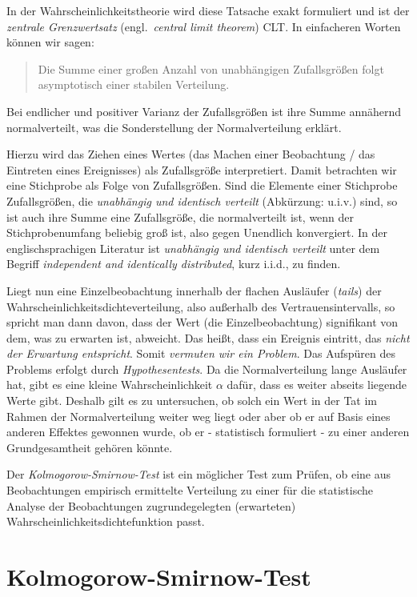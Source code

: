 In der Wahrscheinlichkeitstheorie wird diese Tatsache exakt formuliert und ist der
\textsl{zentrale Grenzwertsatz} (engl.\ \textsl{central limit theorem}) CLT.
In einfacheren Worten können wir sagen:
\begin{quote}
Die Summe einer großen Anzahl von unabhängigen Zufallsgrößen folgt
asymptotisch einer stabilen Verteilung.
\label{zentralesGrenzwerttheorem}
\end{quote}
Bei endlicher und positiver Varianz der Zufallsgrößen ist ihre Summe annähernd
normalverteilt, was die Sonderstellung der Normalverteilung erklärt.

Hierzu wird das Ziehen eines Wertes (das Machen einer Beobachtung / das Eintreten eines
Ereignisses) als Zufallsgröße interpretiert.
Damit betrachten wir eine Stichprobe als Folge von Zufallsgrößen. Sind die Elemente
einer Stichprobe Zufallsgrößen, die
\textsl{unabhängig und identisch verteilt} (Abkürzung: u.i.v.) sind, so ist auch ihre Summe
eine Zufallsgröße, die normalverteilt ist, wenn der Stichprobenumfang beliebig groß ist,
also gegen Unendlich konvergiert. In der englischsprachigen Literatur ist
\textsl{unabhängig und identisch verteilt} unter dem Begriff
\textsl{independent and identically distributed}, kurz i.i.d., zu finden.

Liegt nun eine Einzelbeobachtung innerhalb der flachen
Ausläufer (\textsl{tails}) der Wahrscheinlichkeitsdichteverteilung,
also außerhalb des Vertrauensintervalls, so
spricht man dann davon, dass der Wert (die Einzelbeobachtung)
signifikant von dem, was zu erwarten ist, abweicht. Das heißt, dass ein Ereignis eintritt,
das \textsl{nicht der Erwartung entspricht}. Somit \textsl{vermuten wir ein Problem}. Das Aufspüren
des Problems erfolgt durch \textsl{Hypothesentests}. Da die Normalverteilung
lange Ausläufer hat, gibt es eine kleine Wahrscheinlichkeit $\alpha$ dafür, dass es
weiter abseits liegende Werte gibt. Deshalb gilt es zu untersuchen,
ob solch ein Wert in der Tat im Rahmen der Normalverteilung weiter weg liegt
oder aber ob er auf Basis eines anderen Effektes gewonnen
wurde, ob er - statistisch formuliert - zu einer anderen Grundgesamtheit gehören könnte.

Der \textsl{Kolmogorow-Smirnow-Test} ist ein möglicher Test zum Prüfen, ob eine aus Beobachtungen
empirisch ermittelte Verteilung zu einer für die statistische Analyse der Beobachtungen
zugrundegelegten (erwarteten) Wahrscheinlichkeitsdichtefunktion passt.


\section{Kolmogorow-Smirnow-Test}

